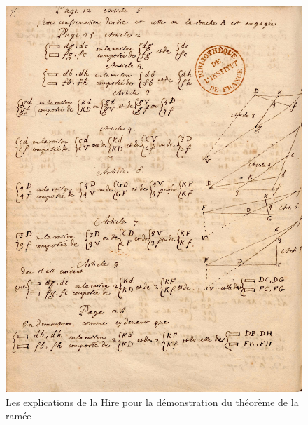\documentclass[12pt, a4paper]{article}
\begin{document}
\newpage
\begin{figure}[!ht]%
\centering
\includegraphics[width=\textwidth]{LaHire-ExplicationsRamee.jpg}
\caption{Les explications de la Hire pour la démonstration du théorème de la ramée}
\label{LaHire-ExplicationsRamee}
\end{figure}

\newpage
\end{document}
